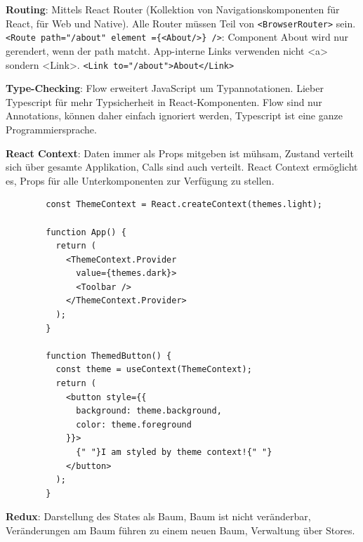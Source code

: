 \documentclass[10pt,landscape]{article}
\begin{document}
\begin{multicols}{2}
        \textbf{Routing}: Mittels React Router (Kollektion von Navigationskomponenten für React, für Web und Native).
        Alle Router müssen Teil von \lstinline{<BrowserRouter>} sein.
        \lstinline[mathescape]!<Route path="/about" element ={<About/>} />!: Component About wird nur gerendert, wenn der path matcht.
        App-interne Links verwenden nicht <a> sondern <Link>. \lstinline[mathescape]!<Link to="/about">About</Link>!

        \textbf{Type-Checking}: Flow erweitert JavaScript um Typannotationen.
        Lieber Typescript für mehr Typsicherheit in React-Komponenten.
        Flow sind nur Annotations, können daher einfach ignoriert werden, Typescript ist eine ganze Programmiersprache.

        \textbf{React Context}: Daten immer als Props mitgeben ist mühsam, Zustand verteilt sich über gesamte Applikation, Calls sind auch verteilt.
        React Context ermöglicht es, Props für alle Unterkomponenten zur Verfügung zu stellen.

        \begin{lstlisting}
        const ThemeContext = React.createContext(themes.light);

        function App() {
          return (
            <ThemeContext.Provider
              value={themes.dark}>
              <Toolbar />
            </ThemeContext.Provider>
          );
        }

        function ThemedButton() {
          const theme = useContext(ThemeContext);
          return (
            <button style={{
              background: theme.background,
              color: theme.foreground
            }}>
              {" "}I am styled by theme context!{" "}
            </button>
          );
        }
        \end{lstlisting}

        \textbf{Redux}: Darstellung des States als Baum, Baum ist nicht veränderbar, Veränderungen am Baum führen zu einem neuen Baum, Verwaltung über Stores.


\end{multicols}
\end{document}
